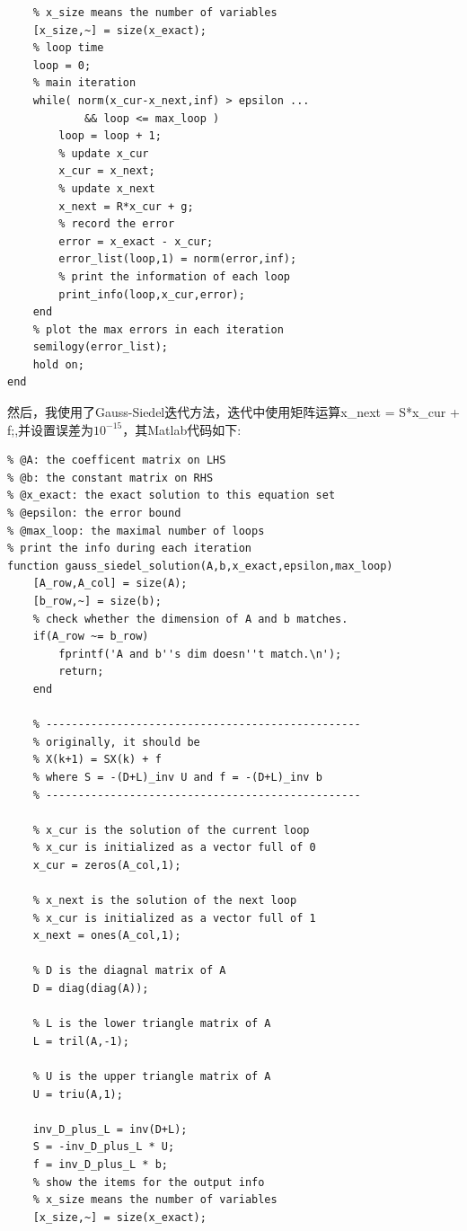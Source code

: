 \documentclass[12pt,a4paper,utf8]{ctexart}
\begin{document}
\begin{enumerate}
\begin{itemize}
\begin{lstlisting}[frame=single]
    % show the items for the output info
    % x_size means the number of variables
    [x_size,~] = size(x_exact);
    % loop time
    loop = 0;
    % main iteration
    while( norm(x_cur-x_next,inf) > epsilon ...
            && loop <= max_loop )
        loop = loop + 1;
        % update x_cur
        x_cur = x_next;
        % update x_next
        x_next = R*x_cur + g;
        % record the error
        error = x_exact - x_cur;
        error_list(loop,1) = norm(error,inf);
        % print the information of each loop
        print_info(loop,x_cur,error);
    end
    % plot the max errors in each iteration
    semilogy(error_list);
    hold on;
end
\end{lstlisting}
    \par
    然后，我使用了Gauss-Siedel迭代方法，迭代中使用矩阵运算x\_next = S*x\_cur + f;,并设置误差为$10^{-15}$，其Matlab代码如下:
\begin{lstlisting}[frame=single]
% implementing jacobi iteration
% @A: the coefficent matrix on LHS
% @b: the constant matrix on RHS
% @x_exact: the exact solution to this equation set
% @epsilon: the error bound
% @max_loop: the maximal number of loops
% print the info during each iteration
function gauss_siedel_solution(A,b,x_exact,epsilon,max_loop)
    [A_row,A_col] = size(A);
    [b_row,~] = size(b);
    % check whether the dimension of A and b matches.
    if(A_row ~= b_row)
        fprintf('A and b''s dim doesn''t match.\n');
        return;
    end
    
    % -------------------------------------------------
    % originally, it should be
    % X(k+1) = SX(k) + f
    % where S = -(D+L)_inv U and f = -(D+L)_inv b
    % -------------------------------------------------
    
    % x_cur is the solution of the current loop
    % x_cur is initialized as a vector full of 0
    x_cur = zeros(A_col,1);
    
    % x_next is the solution of the next loop
    % x_cur is initialized as a vector full of 1
    x_next = ones(A_col,1);
    
    % D is the diagnal matrix of A
    D = diag(diag(A));
    
    % L is the lower triangle matrix of A
    L = tril(A,-1);
    
    % U is the upper triangle matrix of A
    U = triu(A,1);
    
    inv_D_plus_L = inv(D+L);
    S = -inv_D_plus_L * U;
    f = inv_D_plus_L * b;
    % show the items for the output info
    % x_size means the number of variables
    [x_size,~] = size(x_exact);
    

\end{lstlisting}
\end{itemize}
\end{enumerate}
\end{document}
